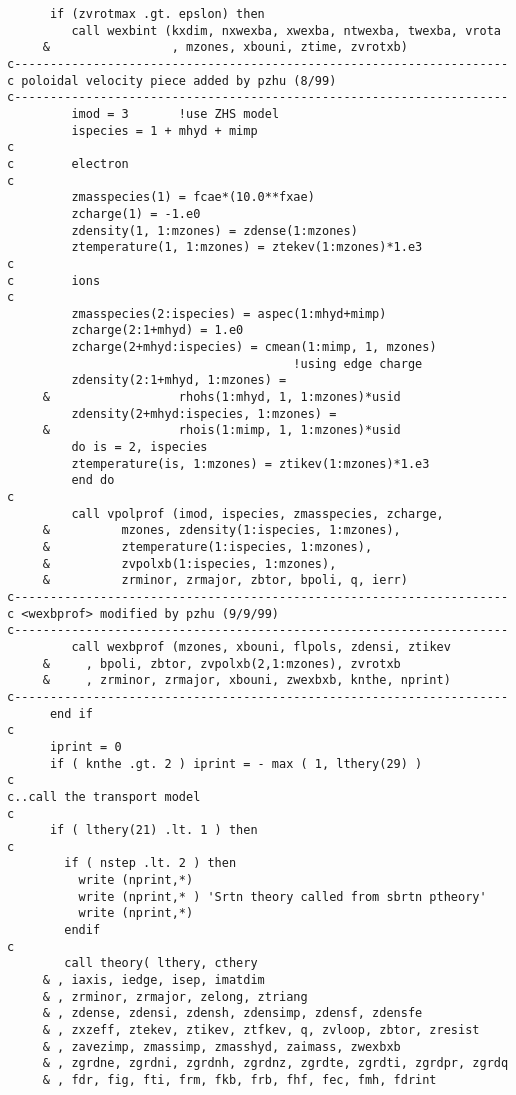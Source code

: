\begin{verbatim}
      if (zvrotmax .gt. epslon) then
         call wexbint (kxdim, nxwexba, xwexba, ntwexba, twexba, vrota
     &                 , mzones, xbouni, ztime, zvrotxb)
c---------------------------------------------------------------------
c poloidal velocity piece added by pzhu (8/99)
c---------------------------------------------------------------------
         imod = 3       !use ZHS model
         ispecies = 1 + mhyd + mimp
c
c        electron
c
         zmasspecies(1) = fcae*(10.0**fxae)
         zcharge(1) = -1.e0
         zdensity(1, 1:mzones) = zdense(1:mzones)
         ztemperature(1, 1:mzones) = ztekev(1:mzones)*1.e3
c
c        ions
c
         zmasspecies(2:ispecies) = aspec(1:mhyd+mimp)
         zcharge(2:1+mhyd) = 1.e0
         zcharge(2+mhyd:ispecies) = cmean(1:mimp, 1, mzones)
                                        !using edge charge
         zdensity(2:1+mhyd, 1:mzones) =
     &                  rhohs(1:mhyd, 1, 1:mzones)*usid
         zdensity(2+mhyd:ispecies, 1:mzones) =
     &                  rhois(1:mimp, 1, 1:mzones)*usid
         do is = 2, ispecies
         ztemperature(is, 1:mzones) = ztikev(1:mzones)*1.e3
         end do
c
         call vpolprof (imod, ispecies, zmasspecies, zcharge,
     &          mzones, zdensity(1:ispecies, 1:mzones),
     &          ztemperature(1:ispecies, 1:mzones),
     &          zvpolxb(1:ispecies, 1:mzones),
     &          zrminor, zrmajor, zbtor, bpoli, q, ierr)
c---------------------------------------------------------------------
c <wexbprof> modified by pzhu (9/9/99)
c---------------------------------------------------------------------
         call wexbprof (mzones, xbouni, flpols, zdensi, ztikev
     &     , bpoli, zbtor, zvpolxb(2,1:mzones), zvrotxb
     &     , zrminor, zrmajor, xbouni, zwexbxb, knthe, nprint)
c---------------------------------------------------------------------
      end if
c
      iprint = 0
      if ( knthe .gt. 2 ) iprint = - max ( 1, lthery(29) )
c
c..call the transport model
c
      if ( lthery(21) .lt. 1 ) then
c
        if ( nstep .lt. 2 ) then
          write (nprint,*)
          write (nprint,* ) 'Srtn theory called from sbrtn ptheory'
          write (nprint,*)
        endif
c
        call theory( lthery, cthery
     & , iaxis, iedge, isep, imatdim
     & , zrminor, zrmajor, zelong, ztriang
     & , zdense, zdensi, zdensh, zdensimp, zdensf, zdensfe
     & , zxzeff, ztekev, ztikev, ztfkev, q, zvloop, zbtor, zresist
     & , zavezimp, zmassimp, zmasshyd, zaimass, zwexbxb
     & , zgrdne, zgrdni, zgrdnh, zgrdnz, zgrdte, zgrdti, zgrdpr, zgrdq
     & , fdr, fig, fti, frm, fkb, frb, fhf, fec, fmh, fdrint

\end{verbatim}
